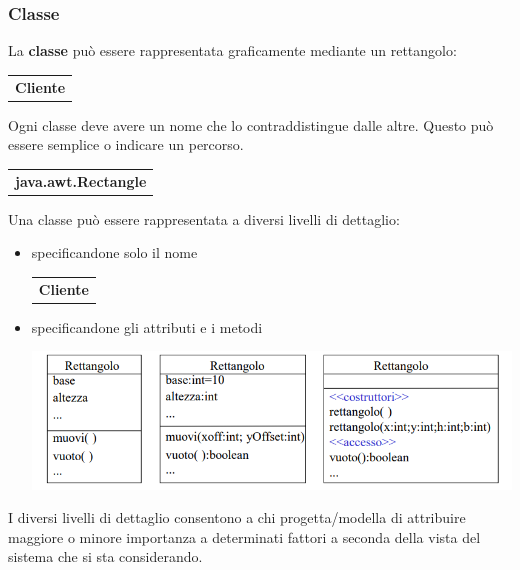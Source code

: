 \documentclass{article}
\begin{document}
	\subsubsection{Classe}
	La \textbf{classe} può essere rappresentata graficamente mediante un rettangolo:
	\begin{center}
		\begin{tabular}{|c|}
		\hline
		\multirow{2}{*}{\textbf{Cliente}} \\
									\\ \hline
		\end{tabular}
	\end{center}
	Ogni classe deve avere un nome che lo contraddistingue dalle altre. Questo può essere semplice o indicare un percorso.
	\begin{center}
		\begin{tabular}{|c|}
		\hline
		\multirow{2}{*}{\textbf{java.awt.Rectangle}} \\
										  \\ \hline
		\end{tabular}
	\end{center}
	Una classe può essere rappresentata a diversi livelli di dettaglio:
	\begin{itemize}
		\item specificandone solo il nome
		\begin{center}
			\begin{tabular}{|c|}
				\hline
				\multirow{2}{*}{\textbf{Cliente}} \\
											\\ \hline
				\end{tabular}
		\end{center}
		\item specificandone gli attributi e i metodi
		\begin{center}
			\includegraphics[scale=0.6]{assets/uml_classi_attr_met.png}
		\end{center}
	\end{itemize}
	I diversi livelli di dettaglio consentono a chi progetta/modella di attribuire maggiore o minore importanza a determinati fattori a seconda della vista del sistema che si sta considerando.
\end{document}
